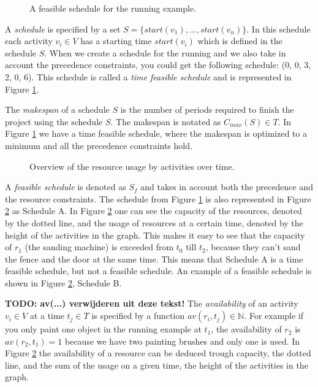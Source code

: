 \documentclass{article}
\theoremstyle{definition}
\newcommand{\inputtikz}[1]{}
\newcommand{\TODO}[1]{{\color{red}\textbf{TODO: #1}}}
\newcommand{\av}[2]{\ensuremath{av(r_{#1}, t_{#2})}} %
\newcommand{\start}[1]{\ensuremath{start(v_{#1})}} %
\newcommand{\makespan}[1]{\ensuremath{C_{max}(#1)}} %
\begin{document}
\begin{figure}[h]
	\centering
	\inputtikz{schedule_feasible}
	\caption{A feasible schedule for the running example. }
	\label{fig:time_feasible_schedule}
\end{figure}

A \emph{schedule} is specified by a set $S = \{\start{1}, \ldots, \start{n}\}$.
In this schedule each activity $v_i \in V$ has a starting time $\start{i}$ which is defined in the schedule $S$.
When we create a schedule for the running and we also take in account the precedence constraints, you could get the following schedule:
(0, 0, 3, 2, 0, 6). 
This schedule is called a \emph{time feasible schedule} and is represented in Figure \ref{fig:time_feasible_schedule}. 

The \emph{makespan} of a schedule $S$ is the number of periods required to finish the project using the schedule $S$. The makespan is notated as $\makespan{S} \in T$.
In Figure \ref{fig:time_feasible_schedule} we have a time feasible schedule, where the makespan is optimized to a minimum and all the precedence constraints hold.

\begin{figure}[h]
	\centering
	\inputtikz{schedule_feasible_profile}
	\caption{Overview of the resource usage by activities over time. }
	\label{fig:feasible_schedule}
\end{figure}

A \emph{feasible schedule} is denoted as $S_f$ and takes in account both the precedence and the resource constraints.
The schedule from Figure \ref{fig:time_feasible_schedule} is also represented in Figure \ref{fig:feasible_schedule} as Schedule A.
In Figure \ref{fig:feasible_schedule} one can see the capacity of the resources, denoted by the dotted line, and the usage of resources at a certain time, denoted by the height of the activities in the graph.
This makes it easy to see that the capacity of $r_1$ (the sanding machine) is exceeded from $t_0$ till $t_2$, because they can't sand the fence and the door at the same time.
This means that Schedule A is a time feasible schedule, but not a feasible schedule.
An example of a feasible schedule is shown in Figure \ref{fig:feasible_schedule}, Schedule B.

\TODO{av(...) verwijderen uit deze tekst!}
The \emph{availability} of an activity $v_i \in V$ at a time $t_j \in T$ is specified by a function $\av{i}{j} \in \mathbb{N}$.
For example if you only paint one object in the running example at $t_1$, the availability of $r_2$ is $\av{2}{1} = 1$ because we have two painting brushes and only one is used.
In Figure \ref{fig:feasible_schedule} the availability of a resource can be deduced trough capacity, the dotted line, and the sum of the usage on a given time, the height of the activities in the graph. 
\end{document}
